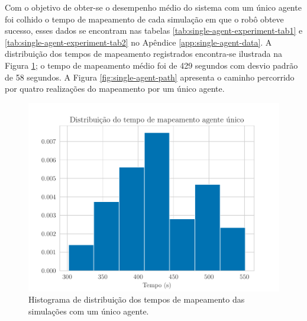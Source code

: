 Com o objetivo de obter-se o desempenho médio do sistema com um único 
agente foi colhido o tempo de mapeamento de cada simulação em que o
robô obteve sucesso, esses dados se encontram nas tabelas \ref{tab:single-agent-experiment-tab1} e \ref{tab:single-agent-experiment-tab2} no Apêndice 
\ref{app:single-agent-data}. A distribuição dos tempos de mapeamento 
registrados encontra-se ilustrada na Figura \ref{fig:time-coverage-single-agent}; o tempo de mapeamento médio foi de 
429 segundos com desvio padrão de 58 segundos. A Figura \ref{fig:single-agent-path} apresenta o caminho percorrido por quatro 
realizações do mapeamento por um único agente.

\begin{figure}
  \centering
  \includegraphics[width=.7\textwidth]{figs/time-coverage-single-agent.pdf}
  \caption[Distribuição do tempo de mapeamento de um único agente]{Histograma de distribuição dos tempos de mapeamento das simulações com um único agente.}
  \label{fig:time-coverage-single-agent}
\end{figure}

